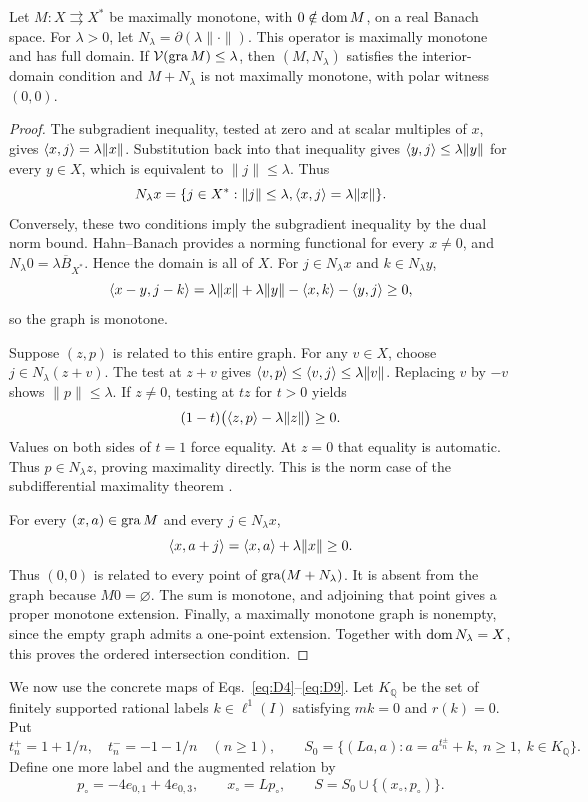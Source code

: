 \begin{lemma}\label{lem:norm-partner}
Let $M:X\rightrightarrows X^*$ be maximally monotone, with
$0\notin\operatorname{dom} M$, on a real Banach space. For $\lambda>0$, let
$N_\lambda=\partial(\lambda\|\cdot\|)$. This operator is maximally
monotone and has full domain. If $\mathcal V(\operatorname{gra} M)\le\lambda$, then
$(M,N_\lambda)$ satisfies the interior-domain condition and
$M+N_\lambda$ is not maximally monotone, with polar witness $(0,0)$.
\end{lemma}
\begin{proof}
The subgradient inequality, tested at zero and at scalar multiples of
$x$, gives $\langle x,j\rangle=\lambda\|x\|$. Substitution back into that
inequality gives $\langle y,j\rangle\le\lambda\|y\|$ for every $y\in X$,
which is equivalent to $\|j\|\le\lambda$. Thus
\[
N_\lambda x=\{j\in X^*: \|j\|\le\lambda,
                  \langle x,j\rangle=\lambda\|x\|\}.
\]
Conversely, these two conditions imply the subgradient inequality by the
dual norm bound. Hahn--Banach provides a norming functional for every
$x\ne0$, and $N_\lambda0=\lambda\overline B_{X^*}$. Hence the domain is
all of $X$. For $j\in N_\lambda x$ and $k\in N_\lambda y$,
\[
\langle x-y,j-k\rangle
=\lambda\|x\|+\lambda\|y\|-\langle x,k\rangle-\langle y,j\rangle\ge0,
\]
so the graph is monotone.

Suppose $(z,p)$ is related to this entire graph. For any $v\in X$,
choose $j\in N_\lambda(z+v)$. The test at $z+v$ gives
$\langle v,p\rangle\le\langle v,j\rangle\le\lambda\|v\|$. Replacing $v$ by $-v$
shows $\|p\|\le\lambda$. If $z\ne0$, testing at $tz$ for $t>0$ yields
\[
(1-t)\bigl(\langle z,p\rangle-\lambda\|z\|\bigr)\ge0.
\]
Values on both sides of $t=1$ force equality. At $z=0$ that equality is
automatic. Thus $p\in N_\lambda z$, proving maximality directly.
This is the norm case of the subdifferential maximality theorem
\cite{rockafellar1970subdiff}.

For every $(x,a)\in\operatorname{gra} M$ and every $j\in N_\lambda x$,
\[
\langle x,a+j\rangle=\langle x,a\rangle+\lambda\|x\|\ge0.
\]
Thus $(0,0)$ is related to every point of $\operatorname{gra}(M+N_\lambda)$. It is absent from the graph
because $M0=\varnothing$. The sum is monotone, and adjoining that point
gives a proper monotone extension. Finally, a maximally monotone graph is
nonempty, since the empty graph admits a one-point extension. Together
with $\operatorname{dom} N_\lambda=X$, this proves the ordered intersection condition.
\end{proof}

We now use the concrete maps of Eqs.~\eqref{eq:D4}--\eqref{eq:D9}.
Let $K_{\mathbb Q}$ be the set of finitely supported rational labels
$k\in\ell^1(I)$ satisfying $mk=0$ and $r(k)=0$. Put
\[
t_n^+=1+1/n,\quad t_n^-=-1-1/n\quad(n\ge1),\qquad
S_0=\{(La,a):a=a^{t_n^\pm}+k,\ n\ge1,\ k\in K_{\mathbb Q}\}.
\]
Define one more label and the augmented relation by
\begin{equation}
p_\circ=-4e_{0,1}+4e_{0,3},\qquad x_\circ=Lp_\circ,
\qquad S=S_0\cup\{(x_\circ,p_\circ)\}.
\label{eq:nonconstructive-seed}
\end{equation}

